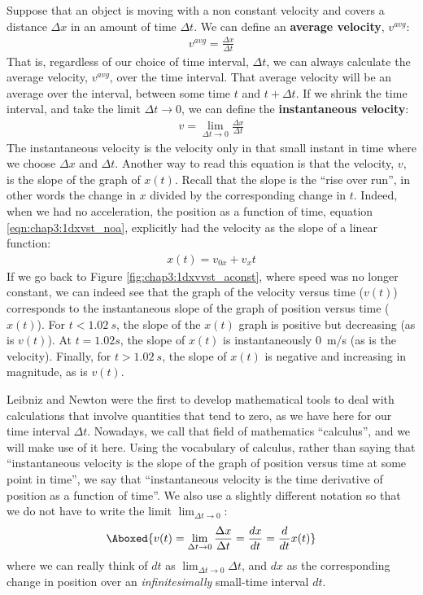 Suppose that an object is moving with a non constant velocity and covers a distance $\Delta x$ in an amount of time $\Delta t$. We can define an \textbf{average velocity}, $v^{avg}$:
\begin{align*}
v^{avg}= \frac{\Delta x}{\Delta t}
\end{align*}
That is, regardless of our choice of time interval, $\Delta t$, we can always calculate the average velocity, $v^{avg}$, over the time interval. That average velocity will be an average over the interval, between some time $t$ and $t+\Delta t$. If we shrink the time interval, and take the limit $\Delta t\to 0$, we can define the \textbf{instantaneous velocity}:
\begin{align*}
v = \lim_{\Delta t\to 0} \frac{\Delta x}{\Delta t}
\end{align*}
The instantaneous velocity is the velocity only in that small instant in time where we choose $\Delta x$ and $\Delta t$. Another way to read this equation is that the velocity, $v$, is the slope of the graph of $x(t)$. Recall that the slope is the ``rise over run'', in other words the change in $x$ divided by the corresponding change in $t$. Indeed, when we had no acceleration, the position as a function of time, equation \ref{eqn:chap3:1dxvst_noa}, explicitly had the velocity as the slope of a linear function:
 \begin{align*}
 x(t) = v_{0x}+v_xt
 \end{align*}
 If we go back to Figure \ref{fig:chap3:1dxvvst_aconst}, where speed was no longer constant, we can indeed see that the graph of the velocity versus time ($v(t)$) corresponds to the instantaneous slope of the graph of position versus time ($x(t)$). For $t<\SI{1.02}{s}$, the slope of the $x(t)$ graph is positive but decreasing (as is $v(t)$). At $t=\SI{1}.02{s}$, the slope of $x(t)$ is instantaneously \SI{0}{m/s} (as is the velocity). Finally, for $t>\SI{1.02}{s}$, the slope of $x(t)$ is negative and increasing in magnitude, as is $v(t)$.

Leibniz and Newton were the first to develop mathematical tools to deal with calculations that involve quantities that tend to zero, as we have here for our time interval $\Delta t$. Nowadays, we call that field of mathematics ``calculus'', and we will make use of it here. Using the vocabulary of calculus, rather than saying that ``instantaneous velocity is the slope of the graph of position versus time at some point in time'', we say that ``instantaneous velocity is the time derivative of position as a function of time''. We also use a slightly different notation so that we do not have to write the limit $\lim_{\Delta t\to 0}$:
\begin{align}
\label{eqn:chap3:vdef}
\Aboxed{v(t)=\lim_{\Delta t\to 0} \frac{\Delta x}{\Delta t}=\frac{dx}{dt}=\frac{d}{dt} x(t)}
\end{align}
where we can really think of $dt$ as $\lim_{\Delta t\to 0}\Delta t$, and $dx$ as the corresponding change in position over an \textit{infinitesimally} small-time interval $dt$.

